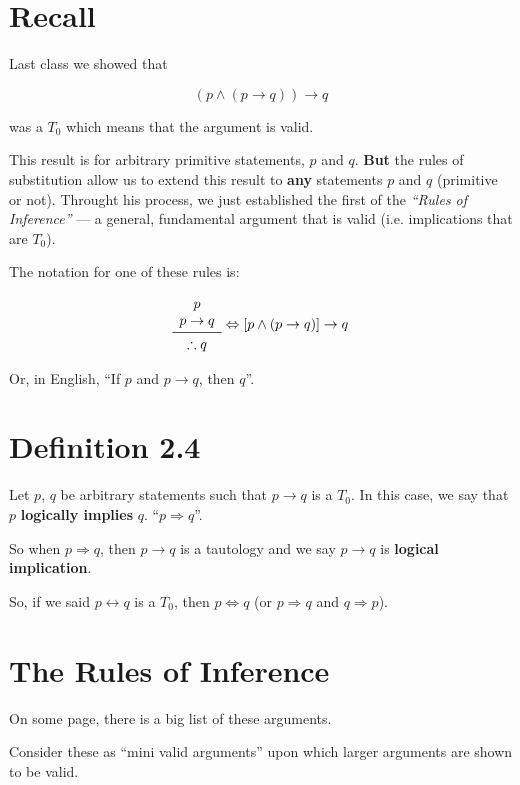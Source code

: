 \documentclass{article}
\begin{document}
\section*{Recall}

Last class we showed that

\[
\left(p\wedge\left(p\rightarrow q\right)\right)\rightarrow q
\]

was a $T_0$ which means that the argument is valid.

This result is for arbitrary primitive statements, $p$ and
$q$. \textbf{But} the rules of substitution allow us to extend this
result to \textbf{any} statements $p$ and $q$ (primitive or
not). Throught his process, we just established the first of the
\textit{``Rules of Inference''} --- a general, fundamental argument
that is valid (i.e. implications that are $T_0$).

The notation for one of these rules is:

\[
\begin{array}{c}
p \\
p\rightarrow q \\
\midrule
\therefore q \\
\end{array}
\Leftrightarrow
\left\lbrack p\wedge (p\rightarrow q) \right\rbrack\rightarrow q
\]

Or, in English, ``If $p$ and $p\rightarrow{}q$, then $q$''.

\section*{Definition 2.4}

Let $p$, $q$ be arbitrary statements such that $p\rightarrow{}q$ is a
$T_0$. In this case, we say that $p$ \textbf{logically implies}
$q$. ``$p\Rightarrow{}q$''.

So when $p\Rightarrow{}q$, then $p\rightarrow{}q$ is a tautology and
we say $p\rightarrow{}q$ is \textbf{logical implication}.

So, if we said $p\leftrightarrow{}q$ is a $T_0$, then
$p\Leftrightarrow{}q$ (or $p\Rightarrow{}q$ and $q\Rightarrow{}p$).

\section*{The Rules of Inference}

On some page, there is a big list of these arguments.

Consider these as ``mini valid arguments'' upon which larger arguments
are shown to be valid.
\end{document}
